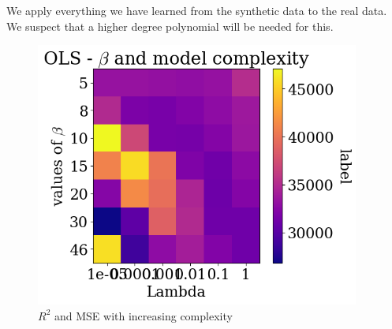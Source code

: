 \documentclass[twoside,11pt]{report}
\begin{document}
We apply everything we have learned from the synthetic data to the real data. We suspect that a higher degree polynomial will be needed for this.
\begin{figure}[!h]
    \begin{center}
        \includegraphics[width=0.95\textwidth]{../runsAndAdditions/heatmapRealData.png}
    \end{center}
    \caption{$R^2$ and MSE with increasing complexity}\label{fig:R2andMSEOLSReal}
\end{figure}
\end{document}
